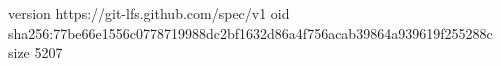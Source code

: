 version https://git-lfs.github.com/spec/v1
oid sha256:77be66e1556c0778719988dc2bf1632d86a4f756acab39864a939619f255288c
size 5207
